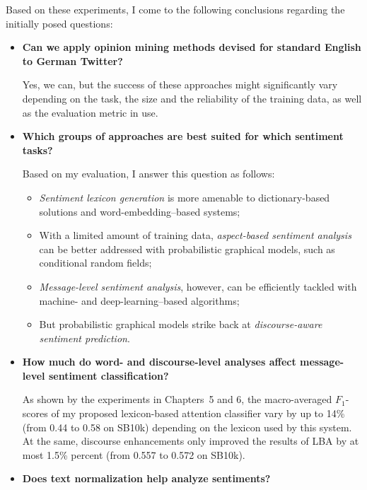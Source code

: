 \documentclass[11pt]{article}
\newcommand{\F}[0]{$F_1$}
\begin{document}
Based on these experiments, I come to the following conclusions
regarding the initially posed questions:

\begin{itemize}
  \item\textbf{Can we apply opinion mining methods devised for
    standard English to German Twitter?}

    Yes, we can, but the success of these approaches might
    significantly vary depending on the task, the size and the
    reliability of the training data, as well as the evaluation metric
    in use.

  \item\textbf{Which groups of approaches are best suited for which
    sentiment tasks?}

    Based on my evaluation, I answer this question as follows:
    \begin{itemize}
      \item\emph{Sentiment lexicon generation} is more amenable to
        dictionary-based solutions and word-embedding--based systems;

      \item With a limited amount of training data, \emph{aspect-based
        sentiment analysis} can be better addressed with probabilistic
        graphical models, such as conditional random fields;

      \item \emph{Message-level sentiment analysis}, however, can be
        efficiently tackled with machine- and deep-learning--based
        algorithms;

      \item But probabilistic graphical models strike back at
        \emph{discourse-aware sentiment prediction}.
    \end{itemize}

  \item\textbf{How much do word- and discourse-level analyses affect
    message-level sentiment classification?}

    As shown by the experiments in Chapters~5 and 6, the
    macro-averaged \F{}-scores of my proposed lexicon-based attention
    classifier vary by up to 14\% (from 0.44 to 0.58 on SB10k)
    depending on the lexicon used by this system.  At the same,
    discourse enhancements only improved the results of LBA by at most
    1.5\% percent (from 0.557 to 0.572 on SB10k).

  \item\textbf{Does text normalization help analyze sentiments?}


\end{itemize}
\end{document}
